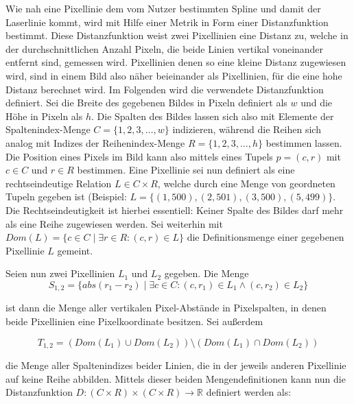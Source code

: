Wie nah eine Pixellinie dem vom Nutzer bestimmten Spline und damit der Laserlinie kommt, wird mit Hilfe einer Metrik in Form einer Distanzfunktion bestimmt. Diese Distanzfunktion weist zwei Pixellinien eine Distanz zu, welche in der durchschnittlichen Anzahl Pixeln, die beide Linien vertikal voneinander entfernt sind, gemessen wird. Pixellinien denen so eine kleine Distanz zugewiesen wird, sind in einem Bild also näher beieinander als Pixellinien, für die eine hohe Distanz berechnet wird. Im Folgenden wird die verwendete Distanzfunktion definiert.\newline
Sei die Breite des gegebenen Bildes in Pixeln definiert als \(w\) und die Höhe in Pixeln als \(h\). Die Spalten des Bildes  lassen sich also mit Elemente der Spaltenindex-Menge \(C = \lbrace 1, 2, 3, \ldots , w \rbrace\) indizieren, während  die Reihen sich analog mit Indizes der Reihenindex-Menge \(R = \lbrace 1, 2, 3, \ldots , h \rbrace\) bestimmen lassen. Die Position eines Pixels im Bild kann also mittels eines Tupels \(p = (c, r)\) mit \(c \in C\) und \(r \in R\) bestimmen. Eine Pixellinie sei nun definiert als eine rechtseindeutige Relation \(L \in C \times R\), welche durch eine Menge von geordneten Tupeln gegeben ist (Beispiel: \(L = \lbrace (1, 500), (2,501), (3, 500), (5, 499) \rbrace\).
Die Rechtseindeutigkeit ist hierbei essentiell: Keiner Spalte des Bildes darf mehr als eine Reihe zugewiesen werden. Sei weiterhin mit \(Dom(L) = \lbrace c \in C \mid \exists r \in R: (c,r) \in L \rbrace\) die Definitionsmenge einer gegebenen Pixellinie \(L\) gemeint.\newline

Seien nun zwei Pixellinien \(L_{1}\) und \(L_{2}\) gegeben. Die Menge
\begin{equation}
\label{equ:DefS}
S_{1,2} = \lbrace abs(r_{1} - r_{2}) \mid \exists c \in C: (c, r_{1}) \in L_{1} \wedge (c, r_{2}) \in L_{2} \rbrace
\end{equation}

ist dann die Menge aller vertikalen Pixel-Abstände in Pixelspalten, in denen beide Pixellinien eine Pixelkoordinate besitzen. Sei außerdem

\begin{equation}
\label{equ:DefT}
T_{1,2} = (Dom(L_{1}) \cup Dom(L_{2})) \setminus (Dom(L_{1}) \cap Dom(L_{2}))   
\end{equation}   

die Menge aller Spaltenindizes beider Linien, die in der jeweils anderen Pixellinie auf keine Reihe abbilden. Mittels dieser beiden Mengendefinitionen kann nun die Distanzfunktion \(D: (C \times R) \times (C \times R) \rightarrow \mathbb{R}\) definiert werden als:


